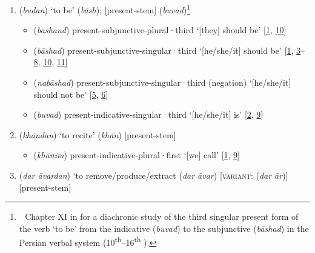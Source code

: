 \begin{enumerate}
    \item {} (\textit{budan}) `to be' \hfill {} (\textit{bāsh});  [\acrshort{present}-\acrshort{stem}]
(\textit{buvad})\footnote{\,\Vid\ Chapter XI in \textcite[251--268]{Lenepveu_Hotz} for a diachronic study of the third singular present form of the verb `to be' from the indicative  (\textit{buvad}) to the subjunctive  (\textit{bāshad}) in the Persian verbal system (10\textsuperscript{th}--16\textsuperscript{th} \ce).}
\begin{itemize}
        \item {} (\textit{bāshand})  \acrshort{present}-\acrshort{subjunctive}-\acrshort{plural}·\acrshort{third} `[they] should be' [\hyperlink{Ppass1}{1}, \hyperlink{Ppass10}{10}]
          \item {} (\textit{bāshad})  \acrshort{present}-\acrshort{subjunctive}-\acrshort{singular}·\acrshort{third} `[he/she/it] should be' [\hyperlink{Ppass1}{1}, \hyperlink{Ppass3}{3}--\hyperlink{Ppass8}{8}, \hyperlink{Ppass10}{10}, \hyperlink{Ppass11}{11}]
          \item {} (\textit{nabāshad}) \acrshort{present}-\acrshort{subjunctive}-\acrshort{singular}·\acrshort{third} (\acrshort{negation}) `[he/she/it] should not be' [\hyperlink{Ppass5}{5}, \hyperlink{Ppass6}{6}]
          \item {} (\textit{buvad}) \acrshort{present}-\acrshort{indicative}-\acrshort{singular}·\acrshort{third} `[he/she/it] is' [\hyperlink{Ppass2}{2}, \hyperlink{Ppass9}{9}]
    \end{itemize}
    \item {} (\textit{khāndan}) `to recite' \hfill {} (\textit{khān}) [\acrshort{present}-\acrshort{stem}]
    \begin{itemize}
        \item {}  (\textit{khānīm}) \acrshort{present}-\acrshort{indicative}-\acrshort{plural}·\acrshort{first} `[we] call' [\hyperlink{Ppass1}{1}, \hyperlink{Ppass9}{9}]
    \end{itemize}
    \item {} (\textit{dar āvardan}) `to remove/produce/extract\newline\phantom{a}\hfill {} (\textit{dar āvar}) [\textsc{variant}:  (\textit{dar ār})] [\acrshort{present}-\acrshort{stem}]
    \begin{itemize}

\end{itemize}
\end{enumerate}
